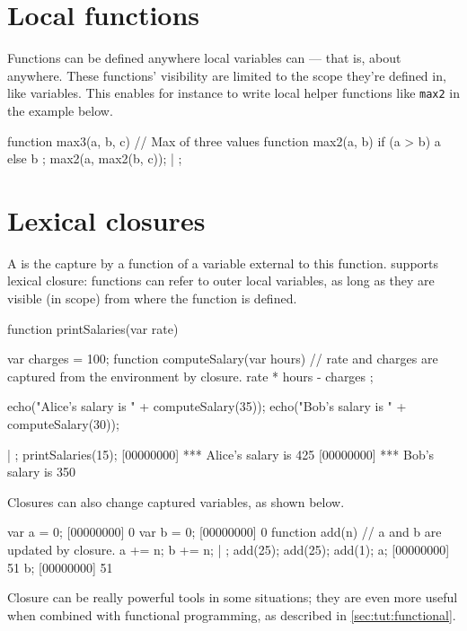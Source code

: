 \section{Local functions}

Functions can be defined anywhere local variables can --- that is, about
anywhere. These functions' visibility are limited to the scope they're
defined in, like variables. This enables for instance to write local helper
functions like \lstinline{max2} in the example below.

\begin{urbiscript}
function max3(a, b, c) // Max of three values
{
  function max2(a, b)
  {
    if (a > b)
      a
    else
      b
  };
  max2(a, max2(b, c));
} | {};
\end{urbiscript}

\section{Lexical closures}

A  is the capture by a function of a variable external to this
function. \us supports lexical closure: functions can refer to outer
local variables, as long as they are visible (in scope) from where
the function is defined.

\begin{urbiscript}
function printSalaries(var rate)
{
  var charges = 100;
  function computeSalary(var hours)
  {
    // rate and charges are captured from the environment by closure.
    rate * hours - charges
  };

  echo("Alice's salary is " + computeSalary(35));
  echo("Bob's salary is " + computeSalary(30));
} | {};
printSalaries(15);
[00000000] *** Alice's salary is 425
[00000000] *** Bob's salary is 350
\end{urbiscript}

Closures can also change captured variables, as shown below.

\begin{urbiscript}
var a = 0;
[00000000] 0
var b = 0;
[00000000] 0
function add(n)
{
  // a and b are updated by closure.
  a += n;
  b += n;
  {}
} | {};
add(25);
add(25);
add(1);
a;
[00000000] 51
b;
[00000000] 51
\end{urbiscript}

Closure can be really powerful tools in some situations; they are even more
useful when combined with functional programming, as described in
\autoref{sec:tut:functional}.



